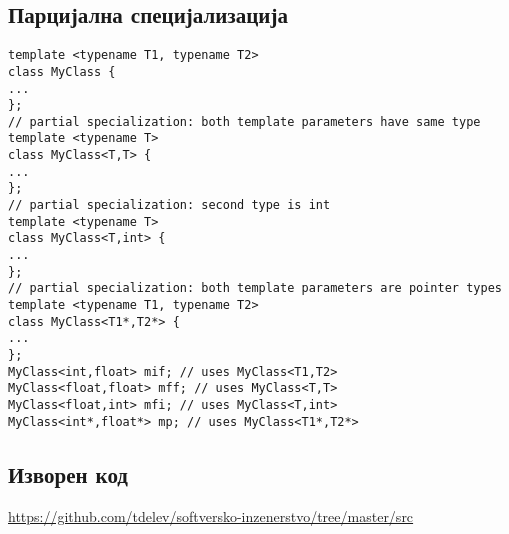 \subsection{Парцијална специјализација}

\begin{lstlisting}
template <typename T1, typename T2>
class MyClass {
...
};
// partial specialization: both template parameters have same type
template <typename T>
class MyClass<T,T> {
...
};
// partial specialization: second type is int
template <typename T>
class MyClass<T,int> {
...
};
// partial specialization: both template parameters are pointer types
template <typename T1, typename T2>
class MyClass<T1*,T2*> {
...
};
MyClass<int,float> mif; // uses MyClass<T1,T2>
MyClass<float,float> mff; // uses MyClass<T,T>
MyClass<float,int> mfi; // uses MyClass<T,int>
MyClass<int*,float*> mp; // uses MyClass<T1*,T2*>

\end{lstlisting}

\subsection{Изворен код}
\href{https://github.com/tdelev/softversko-inzenerstvo/tree/master/src}{https://github.com/tdelev/softversko-inzenerstvo/tree/master/src}


